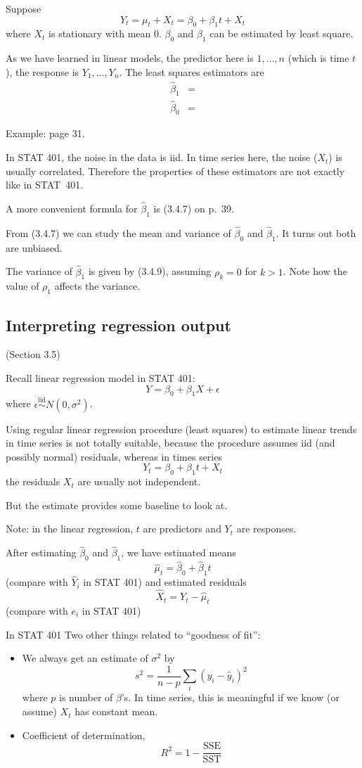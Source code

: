 \documentclass[12pt]{article}
\begin{document}
Suppose
\[
Y_t = \mu_t + X_t = \beta_0 + \beta_1 t + X_t
\]
where $X_t$ is stationary with mean 0.
$\beta_0$ and $\beta_1$ can be estimated by least square.

As we have learned in linear models, the predictor here is
$1,\dotsc,n$ (which is time $t$),
the response is $Y_1,\dotsc,Y_n$.
The least squares estimators are
\[\begin{split}
\hat\beta_1 & =\\
\hat\beta_0 &=
\end{split}
\]

Example: page 31.

In STAT 401,
the noise in the data is iid.
In time series here,
the noise ($X_t$) is usually correlated.
Therefore the properties of these estimators are not exactly
like in STAT~401.

A more convenient formula for $\hat\beta_1$ is (3.4.7) on p.~39.

From (3.4.7) we can study the mean and variance of $\hat\beta_0$ and
$\hat\beta_1$. It turns out both are unbiased.

The variance of $\hat\beta_1$ is given by (3.4.9),
assuming $\rho_k = 0$ for $k > 1$.
Note how the value of $\rho_1$ affects the variance.

\subsection{Interpreting regression output}
(Section 3.5)

Recall linear regression model in STAT 401:
\[
Y = \beta_0 + \beta_1 X + \epsilon
\]
where $\epsilon \overset{\text{iid}}{\sim} N(0, \sigma^2)$.

Using regular linear regression procedure (least squares)
to estimate linear trends in time series is not totally suitable,
because the procedure assumes iid (and possibly normal) residuals,
whereas in times series
\[
Y_t = \beta_0 + \beta_1 t + X_t
\]
the residuals $X_t$ are usually not independent.

But the estimate provides some baseline to look at.

Note: in the linear regression, $t$ are predictors and $Y_t$ are
responses.

After estimating $\hat\beta_0$ and $\hat\beta_1$, we have estimated
means
\[
\hat\mu_t = \hat\beta_0 + \hat\beta_1 t
\]
(compare with $\hat{Y}_i$ in STAT 401)
and estimated residuals
\[
\hat{X}_t = Y_t - \hat\mu_t
\]
(compare with $e_i$ in STAT 401)

In STAT 401
Two other things related to ``goodness of fit'':
\begin{itemize}
\item We always get an estimate of $\sigma^2$ by
    \[
        s^2 = \frac{1}{n-p} \sum_i (y_i - \hat{y}_i)^2
    \]
    where $p$ is number of $\beta$'s.
    In time series, this is meaningful if we know (or assume)
    $X_t$ has constant mean.
\item Coefficient of determination,
    \[
        R^2 = 1 - \frac{\text{SSE}}{\text{SST}}
    \]
\end{itemize}
\end{document}
